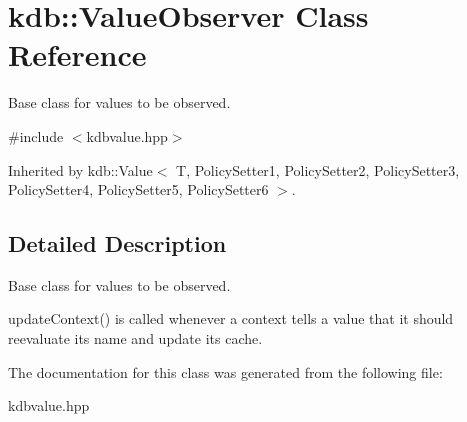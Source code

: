 \hypertarget{classkdb_1_1ValueObserver}{\section{kdb\+:\+:Value\+Observer Class Reference}
\label{classkdb_1_1ValueObserver}
}


Base class for values to be observed.  




{\ttfamily \#include $<$kdbvalue.\+hpp$>$}



Inherited by kdb\+::\+Value$<$ T, Policy\+Setter1, Policy\+Setter2, Policy\+Setter3, Policy\+Setter4, Policy\+Setter5, Policy\+Setter6 $>$.



\subsection{Detailed Description}
Base class for values to be observed. 

update\+Context() is called whenever a context tells a value that it should reevaluate its name and update its cache. 

The documentation for this class was generated from the following file\+:\begin{DoxyCompactItemize}
\item 
kdbvalue.\+hpp\end{DoxyCompactItemize}
